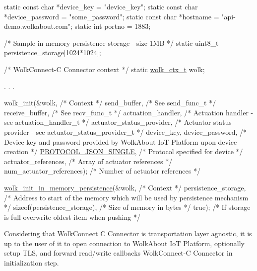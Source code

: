 \begin{DoxyCode}
\textcolor{keyword}{static} \textcolor{keyword}{const} \textcolor{keywordtype}{char} *device\_key = \textcolor{stringliteral}{"device\_key"};
\textcolor{keyword}{static} \textcolor{keyword}{const} \textcolor{keywordtype}{char} *device\_password = \textcolor{stringliteral}{"some\_password"};
\textcolor{keyword}{static} \textcolor{keyword}{const} \textcolor{keywordtype}{char} *hostname = \textcolor{stringliteral}{"api-demo.wolkabout.com"};
\textcolor{keyword}{static} \textcolor{keywordtype}{int} portno = 1883;

\textcolor{comment}{/* Sample in-memory persistence storage - size 1MB */}
\textcolor{keyword}{static} uint8\_t persistence\_storage[1024*1024];

\textcolor{comment}{/* WolkConnect-C Connector context */}
\textcolor{keyword}{static} \hyperlink{structwolk__ctx}{wolk\_ctx\_t} wolk;

.
.
.

wolk\_init(&wolk,                                             \textcolor{comment}{/* Context */}
          send\_buffer,                                       \textcolor{comment}{/* See send\_func\_t */}
          receive\_buffer,                                    \textcolor{comment}{/* See recv\_func\_t */}
          actuation\_handler,                                 \textcolor{comment}{/* Actuation handler        - see
       actuation\_handler\_t */}
          actuator\_status\_provider,                          \textcolor{comment}{/* Actuator status provider - see
       actuator\_status\_provider\_t */}
          device\_key, device\_password,                       \textcolor{comment}{/* Device key and password provided by
       WolkAbout IoT Platform upon device creation */}
          \hyperlink{wolk__connector_8h_a91e19fa4fff461493e1a41f7c7aa4e5fa9574b7cae2523f47c59e082e473223bd}{PROTOCOL\_JSON\_SINGLE},                              \textcolor{comment}{/* Protocol specified for
       device */}
          actuator\_references,                               \textcolor{comment}{/* Array of actuator references */}
          num\_actuator\_references);                          \textcolor{comment}{/* Number of actuator references */}

\hyperlink{wolk__connector_8h_a0fbb983c6b65072501b078ba6ff8e5ad}{wolk\_init\_in\_memory\_persistence}(&wolk,                       \textcolor{comment}{/* Context */}
                                persistence\_storage,         \textcolor{comment}{/* Address to start of the memory which will
       be used by persistence mechanism */}
                                \textcolor{keyword}{sizeof}(persistence\_storage), \textcolor{comment}{/* Size of memory in bytes */}
                                \textcolor{keyword}{true});                       \textcolor{comment}{/* If storage is full overwrite oldest item
       when pushing */}
\end{DoxyCode}
 Considering that Wolk\+Connect C Connector is transportation layer agnostic, it is up to the user of it to open connection to Wolk\+About IoT Platform, optionally setup T\+LS, and forward read/write callbacks Wolk\+Connect-\/C Connector in initialization step.

